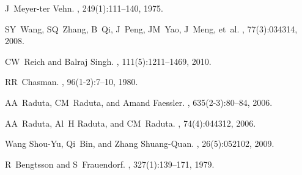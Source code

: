 \documentclass[myclassdoc,debug]{rjparticle}
\begin{document}
\begin{thebibliography}{99}
J~Meyer-ter Vehn.
, 249(1):111--140, 1975.

SY~Wang, SQ~Zhang, B~Qi, J~Peng, JM~Yao, J~Meng, et~al.
, 77(3):034314, 2008.

CW~Reich and Balraj Singh.
, 111(5):1211--1469, 2010.

RR~Chasman.
, 96(1-2):7--10, 1980.

AA~Raduta, CM~Raduta, and Amand Faessler.
, 635(2-3):80--84, 2006.

AA~Raduta, Al~H Raduta, and CM~Raduta.
, 74(4):044312, 2006.

Wang Shou-Yu, Qi~Bin, and Zhang Shuang-Quan.
, 26(5):052102, 2009.

R~Bengtsson and S~Frauendorf.
, 327(1):139--171, 1979.
\end{thebibliography}
\end{document}
